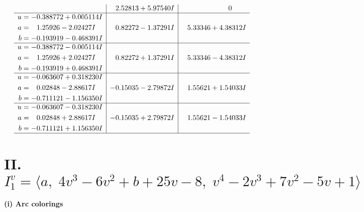 \documentclass[1p]{elsarticle_modified}
\theoremstyle{definition}
\begin{document}
$$\begin{array}{c|c|c}
 & \phantom{-}2.52813 + 5.97540 I & \phantom{-0.000000 } 0 \\ \hline\begin{aligned}
u &= -0.388772 + 0.005114 I \\
a &= \phantom{-}1.25926 - 2.02427 I \\
b &= -0.193919 - 0.468391 I\end{aligned}
 & \phantom{-}0.82272 - 1.37291 I & \phantom{-}5.33346 + 4.38312 I \\ \hline\begin{aligned}
u &= -0.388772 - 0.005114 I \\
a &= \phantom{-}1.25926 + 2.02427 I \\
b &= -0.193919 + 0.468391 I\end{aligned}
 & \phantom{-}0.82272 + 1.37291 I & \phantom{-}5.33346 - 4.38312 I \\ \hline\begin{aligned}
u &= -0.063607 + 0.318230 I \\
a &= \phantom{-}0.02848 - 2.88617 I \\
b &= -0.711121 - 1.156350 I\end{aligned}
 & -0.15035 - 2.79872 I & \phantom{-}1.55621 + 1.54033 I \\ \hline\begin{aligned}
u &= -0.063607 - 0.318230 I \\
a &= \phantom{-}0.02848 + 2.88617 I \\
b &= -0.711121 + 1.156350 I\end{aligned}
 & -0.15035 + 2.79872 I & \phantom{-}1.55621 - 1.54033 I\\
 \hline 
 \end{array}$$\newpage\newpage\renewcommand{\arraystretch}{1}
\centering \section*{II. $I^v_{1}= \langle a,\;4 v^3-6 v^2+b+25 v-8,\;v^4-2 v^3+7 v^2-5 v+1 \rangle$}
\flushleft \textbf{(i) Arc colorings}\\
\end{document}

